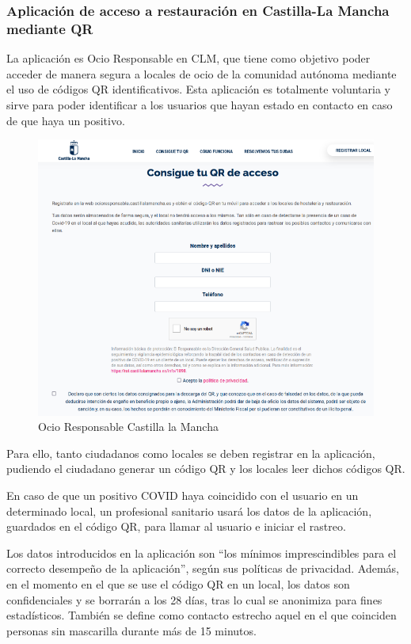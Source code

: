 \documentclass[11pt,a4paper,spanish]{article}
\begin{document}
\subsubsection{Aplicación de acceso a restauración en Castilla-La Mancha mediante QR}

La aplicación es Ocio Responsable en CLM, que tiene como objetivo poder acceder de manera segura a locales de ocio de la comunidad autónoma mediante el uso de códigos QR identificativos. Esta aplicación es totalmente voluntaria y sirve para poder identificar a los usuarios que hayan estado en contacto en caso de que haya un positivo.

\begin{figure}[h!]
  \centering
  \includegraphics[width=0.80\linewidth]{6.png} 
  \caption{Ocio Responsable Castilla la Mancha}
\end{figure}

Para ello, tanto ciudadanos como locales se deben registrar en la aplicación, pudiendo el ciudadano generar un código QR y los locales leer dichos códigos QR.

En caso de que un positivo COVID haya coincidido con el usuario en un determinado local, un profesional sanitario usará los datos de la aplicación, guardados en el código QR, para llamar al usuario e iniciar el rastreo.

Los datos introducidos en la aplicación son “los mínimos imprescindibles para el correcto desempeño de la aplicación”, según sus políticas de privacidad. Además, en el momento en el que se use el código QR en un local, los datos son confidenciales y se borrarán a los 28 días, tras lo cual se anonimiza para fines estadísticos. También se define como contacto estrecho aquel en el que coinciden personas sin mascarilla durante más de 15 minutos.
\end{document}
